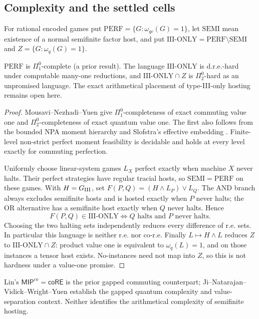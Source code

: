 \subsection{Complexity and the settled cells}
For rational encoded games put $\mathrm{PERF}=\{G: \omega_{qc}(G)=1\}$, let $\mathrm{SEMI}$ mean existence of a normal semifinite factor host, and put $\mathrm{III\!\text{-}\!ONLY}=\mathrm{PERF}\setminus\mathrm{SEMI}$ and $Z=\{G: \omega_q(G)=1\}$.
\begin{theorem}\label{thm:type-complexity}
$\mathrm{PERF}$ is $\Pi^0_1$-complete (a prior result). The language $\mathrm{III\!\text{-}\!ONLY}$ is d.r.e.-hard under computable many-one reductions, and $\mathrm{III\!\text{-}\!ONLY}\cap Z$ is $\Pi^0_2$-hard as an unpromised language. The exact arithmetical placement of type-III-only hosting remains open here.
\end{theorem}
\begin{proof}
Mousavi--Nezhadi--Yuen \cite[Theorems 6.4 and 6.9]{MNY} give $\Pi^0_1$-completeness of exact commuting value one and $\Pi^0_2$-completeness of exact quantum value one. The first also follows from the bounded NPA moment hierarchy \cite{NPA} and Slofstra's effective embedding \cite[Corollary 3.3]{SloEmbedding}. Finite-level non-strict perfect moment feasibility is decidable and holds at every level exactly for commuting perfection.

Uniformly choose linear-system games $L_X$ perfect exactly when machine $X$ never halts. Their perfect strategies have regular tracial hosts, so $\mathrm{SEMI}=\mathrm{PERF}$ on these games. With $H=G_{\mathrm{III}}$, set $F(P,Q)=(H\wedge L_P)\vee L_Q$. The AND branch always excludes semifinite hosts and is hosted exactly when $P$ never halts; the OR alternative has a semifinite host exactly when $Q$ never halts. Hence
\[
 F(P,Q)\in\mathrm{III\!\text{-}\!ONLY}
 \iff Q\text{ halts and }P\text{ never halts}.
\]
Choosing the two halting sets independently reduces every difference of r.e. sets. In particular this language is neither r.e. nor co-r.e. Finally $L\mapsto H\wedge L$ reduces $Z$ to $\mathrm{III\!\text{-}\!ONLY}\cap Z$: product value one is equivalent to $\omega_q(L)=1$, and on those instances a tensor host exists. No-instances need not map into $Z$, so this is not hardness under a value-one promise.
\end{proof}
Lin's $\mathsf{MIP}^{co}=\mathsf{coRE}$ \cite[Theorem 1.1]{Lin} is the prior gapped commuting counterpart; Ji--Natarajan--Vidick--Wright--Yuen \cite{JNVWY} establish the gapped quantum complexity and value-separation context. Neither identifies the arithmetical complexity of semifinite hosting.

